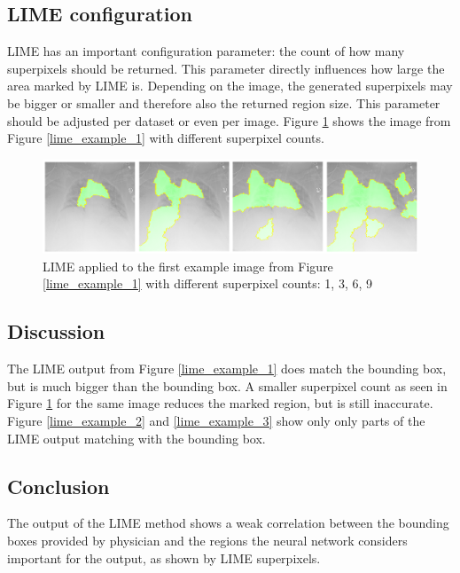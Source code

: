 \subsection{LIME configuration}
LIME has an important configuration parameter: the count of how many superpixels should be returned. This parameter directly influences how large the area marked by LIME is. Depending on the image, the generated superpixels may be bigger or smaller and therefore also the returned region size. This parameter should be adjusted per dataset or even per image. Figure \ref{lime_superpixel_count} shows the image from Figure \ref{lime_example_1} with different superpixel counts.

\begin{figure}[H]
\centering
\includegraphics[width=14cm]{chapters/03_classification/images/lime-superpixel.png}
\caption{LIME applied to the first example image from Figure \ref{lime_example_1} with different superpixel counts: 1, 3, 6, 9}
\label{lime_superpixel_count}
\end{figure}

\subsection{Discussion}
The LIME output from Figure \ref{lime_example_1} does match the bounding box, but is much bigger than the bounding box. A smaller superpixel count as seen in Figure \ref{lime_superpixel_count} for the same image reduces the marked region, but is still inaccurate. Figure \ref{lime_example_2} and \ref{lime_example_3} show only only parts of the LIME output matching with the bounding box.

\subsection{Conclusion}
The output of the LIME method shows a weak correlation between the bounding boxes provided by physician and the regions the neural network considers important for the output, as shown by LIME superpixels.
